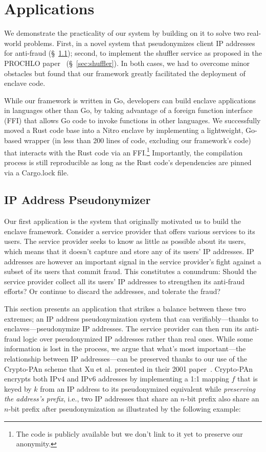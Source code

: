 \section{Applications}
\label{sec:applications}

We demonstrate the practicality of our system by building on it to solve two
real-world problems.  First, in a novel system that pseudonymizes client IP
addresses for anti-fraud (\S~\ref{sec:pseudonymization}); second, to implement
the shuffler service as proposed in the PROCHLO paper~\cite{Bittau2017a}
(\S~\ref{sec:shuffler}).  In both cases, we had to overcome minor obstacles but
found that our framework greatly facilitated the deployment of enclave code.

While our framework is written in Go, developers can build enclave applications
in languages other than Go, by taking advantage of a foreign function interface
(FFI) that allows Go code to invoke functions in other languages.  We
successfully moved a Rust code base into a Nitro enclave by implementing a
lightweight, Go-based wrapper (in less than 200 lines of code, excluding our
framework's code) that interacts with the Rust code via an FFI.\footnote{The
code is publicly available but we don't link to it yet to preserve our
anonymity.} Importantly, the compilation process is still reproducible as long
as the Rust code's dependencies are pinned via a Cargo.lock file.

\subsection{IP Address Pseudonymizer}
\label{sec:pseudonymization}

Our first application is the system that originally motivated us to build the
enclave framework. Consider a service provider that offers various services to
its users.  The service provider seeks to know as little as possible about its
users, which means that it doesn't capture and store any of its users' IP
addresses.  IP addresses are however an important signal in the service
provider's fight against a subset of its users that commit fraud.  This
constitutes a conundrum: Should the service provider collect all its users' IP
addresses to strengthen its anti-fraud efforts?  Or continue to discard the
addresses, and tolerate the fraud?

This section presents an application that strikes a balance between these two
extremes; an IP address pseudonymization system that can verifiably---thanks to
enclaves---pseudonymize IP addresses.  The service provider can then run its
anti-fraud logic over pseudonymized IP addresses rather than real ones.  While
some information is lost in the process, we argue that what's most
important---the relationship between IP addresses---can be preserved thanks to
our use of the Crypto-PAn scheme that Xu et al. presented in their 2001
paper~\cite{Xu01a}.  Crypto-PAn encrypts both IPv4 and IPv6 addresses by
implementing a 1:1 mapping $f$ that is keyed by $k$ from an IP address to its
pseudonymized equivalent while \emph{preserving the address's prefix}, i.e., two
IP addresses that share an $n$-bit prefix also share an $n$-bit prefix after
pseudonymization as illustrated by the following example:

